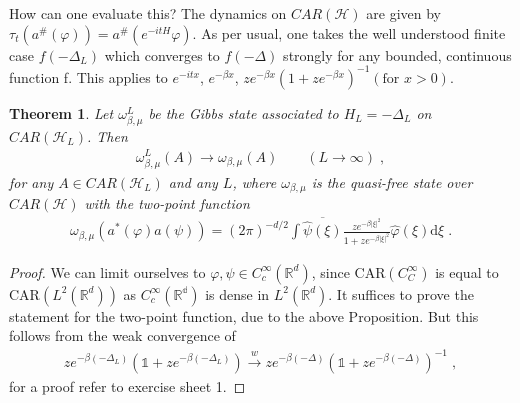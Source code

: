 \documentclass[
a4paper, %
11pt, %
onecolumn, %
openany, %
]{memoir}
\theoremstyle{definition}
\theoremstyle{remark}
\theoremstyle{plain}
\newtheorem{theorem}{Theorem}[chapter]
\begin{document}
How can one evaluate this? The dynamics on $CAR(\mathcal{H})$ are given by $\tau_t(a^{\#}(\varphi))=a^{\#}(e^{-itH}\varphi)$. As per usual, one takes the well understood finite case $f(-\Delta_L)$ which converges to $f(-\Delta)$ strongly for any bounded, continuous function f. This applies to $e^{-itx}$, $e^{-\beta x}$, $ze^{-\beta x}(1+ze^{-\beta x})^{-1} (\text{for }x>0)$.
\begin{theorem}
	Let $\omega_{\beta,\mu}^L$ be the Gibbs state associated to $H_L=-\Delta_L$ on $CAR(\mathcal{H}_L)$. Then \begin{align*}
	\omega_{\beta,\mu}^L(A)\overset{}{\longrightarrow}\omega_{\beta,\mu}(A) \qquad (L\rightarrow \infty)\; ,
	\end{align*}
	for any $A\in CAR(\mathcal{H}_{L})$ and any $L$, where $\omega_{\beta,\mu}$ is the quasi-free state over $CAR(\mathcal{H})$ with the two-point function \begin{align}
		\omega_{\beta,\mu}(a^*(\varphi)a(\psi))=(2\pi)^{-d/2}\int\overline{\hat{\psi}(\xi)}\frac{ze^{-\beta |\xi|^2}}{1+ze^{-\beta|\xi|^2}}\hat{\varphi}(\xi)\mathrm{d}\xi\; .
	\end{align}
\end{theorem}
\begin{proof}
We can limit ourselves to $\varphi,\psi\in C_c^{\infty}(\mathbb{R}^d)$, since $\mathrm{CAR}(C_C^{\infty})$ is equal to $\mathrm{CAR}(L^2(\mathbb{R}^d))$ as $C_c^{\infty}(\mathbb{R^d})$ is dense in $L^2(\mathbb{R}^d)$.
	It suffices to prove the statement for the two-point function, due to the above Proposition. But this follows from the weak convergence of \begin{align}
	ze^{-\beta(-\Delta_L)}(\mathds{1}+ze^{-\beta(-\Delta_L)})\overset{w}{\longrightarrow}ze^{-\beta(-\Delta)}\left(\mathds{1}+ze^{-\beta(-\Delta)}\right)^{-1}\; ,
	\end{align}
	for a proof refer to exercise sheet 1.
\end{proof}
\end{document}
